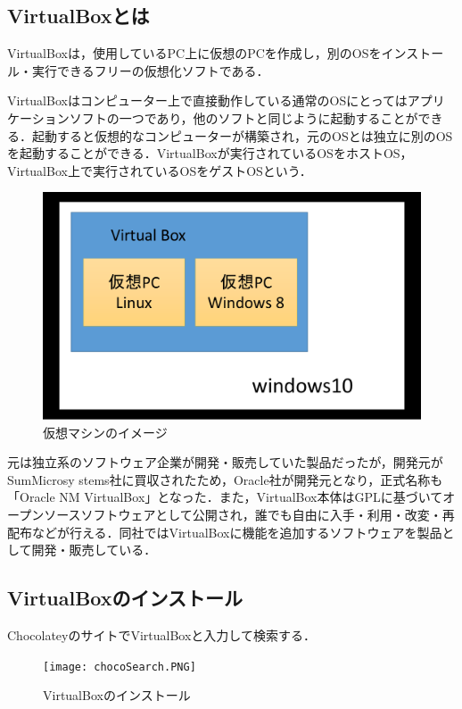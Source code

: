 \subsection{VirtualBoxとは}
VirtualBoxは，使用しているPC上に仮想のPCを作成し，別のOSをインストール・実行できるフリーの仮想化ソフトである．

VirtualBoxはコンピューター上で直接動作している通常のOSにとってはアプリケーションソフトの一つであり，他のソフトと同じように起動することができる．起動すると仮想的なコンピューターが構築され，元のOSとは独立に別のOSを起動することができる．VirtualBoxが実行されているOSをホストOS，VirtualBox上で実行されているOSをゲストOSという．

\begin{figure}[h]
\centering
\includegraphics[width=12cm]{virtualbox.pdf}
\caption{仮想マシンのイメージ}\label{サンプル図}
\end{figure}

元は独立系のソフトウェア企業が開発・販売していた製品だったが，開発元がSumMicrosy stems社に買収されたため，Oracle社が開発元となり，正式名称も「Oracle NM VirtualBox」となった．また，VirtualBox本体はGPLに基づいてオープンソースソフトウェアとして公開され，誰でも自由に入手・利用・改変・再配布などが行える．同社ではVirtualBoxに機能を追加するソフトウェアを製品として開発・販売している．
\newpage


\subsection{VirtualBoxのインストール}
ChocolateyのサイトでVirtualBoxと入力して検索する．

\begin{figure}[h]
\centering
\texttt{[image: chocoSearch.PNG]}
\caption{VirtualBoxのインストール}\label{サンプル図}
\end{figure}



